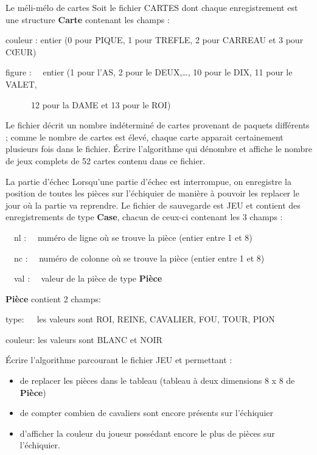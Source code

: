 \begin{Exercice}{Le méli-mélo de cartes}
	Soit le fichier CARTES dont chaque
	enregistrement est une structure
	{\textbf{Carte}}
	contenant les champs :

	{ couleur : entier (0 pour PIQUE, 1 pour TREFLE, 
	2 pour CARREAU et 3 pour CŒUR)~}

	{	figure : \ \ entier (1 pour l’AS, 2 pour le DEUX,…, 10 pour le DIX, 11
	pour le VALET,}

	{	\ \ \ \ \ \ 12 pour la DAME et 13 pour le ROI)}

	
	Le fichier décrit un nombre indéterminé de
	cartes provenant de paquets différents ; comme le nombre de cartes est
	élevé, chaque carte apparait certainement plusieurs fois dans le
	fichier. Écrire l’algorithme qui dénombre et affiche le nombre de jeux
	complets de 52 cartes contenu dans ce fichier.
\end{Exercice}

\begin{Exercice}{La partie d’échec}
	Lorsqu’une partie d’échec est interrompue, on enregistre la position de
	toutes les pièces sur l’échiquier de manière à pouvoir les replacer le
	jour où la partie va reprendre. Le fichier de sauvegarde est JEU et
	contient des enregistrements de type \textbf{Case}, chacun de ceux-ci
	contenant les 3 champs :

	{	\ \ nl : \ \ numéro de ligne où se trouve la pièce (entier entre 1 et
	8)}

	{	\ \ nc : \ \ numéro de colonne où se trouve la pièce (entier entre 1 et
	8)}

	{	\ \ val : \ \ valeur de la pièce de type \textbf{Pièce}}


	\bigskip

	{	\textbf{Pièce} contient 2 champs: }

	{	type:\ \  \ les valeurs sont ROI, REINE, CAVALIER, FOU, TOUR, PION}

	{	couleur: les valeurs sont BLANC et NOIR}


	\bigskip

	Écrire l’algorithme parcourant le fichier JEU et permettant :

	\liststyleListv
	\begin{itemize}
		\item 
			de replacer les pièces dans le tableau 
			(tableau à deux dimensions 8 x 8 de \textbf{Pièce})
		\item 
			de compter combien de cavaliers sont encore présents sur l’échiquier
		\item 
			d’afficher la couleur du joueur possédant encore le plus de pièces sur
			l’échiquier.
	\end{itemize}
\end{Exercice}	

